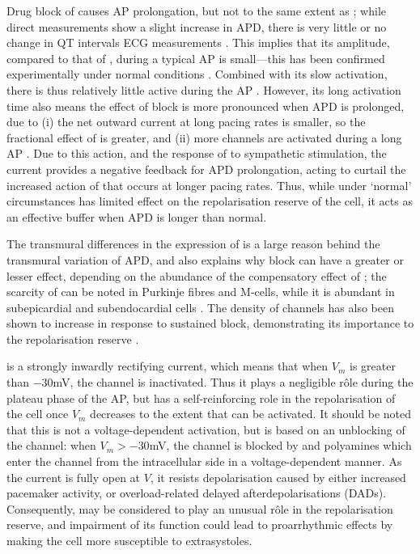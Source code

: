 \documentclass[../thesis-main.tex]{subfiles}
\begin{document}
Drug block of \iks{} causes AP prolongation, but not to the same extent as \ikr{}; while direct measurements show a slight increase in APD, there is very little or no change in QT intervals ECG measurements \citep{Varro2000, Lengyel2001, Jost2005}. This implies that its amplitude, compared to that of \ikr{}, during a typical AP is small---this has been confirmed experimentally under normal conditions \citep{Varro2011}. Combined with its slow activation, there is thus relatively little \iks{} active during the AP \citep{Jost2005}. However, its long activation time also means the effect of \iks{} block is more pronounced when APD is prolonged, due to (i) the net outward current at long pacing rates is smaller, so the fractional effect of \iks{} is greater, and (ii) more channels are activated during a long AP \citep{Carmeliet2006}. Due to this action, and the response of \iks{} to sympathetic stimulation, the current provides a negative feedback for APD prolongation, acting to curtail the increased action of \ica{} that occurs at longer pacing rates. Thus, while under `normal' circumstances \iks{} has limited effect on the repolarisation reserve of the cell, it acts as an effective buffer when APD is longer than normal.

The transmural differences in the expression of \iks{} is a large reason behind the transmural variation of APD, and also explains why \ikr{} block can have a greater or lesser effect, depending on the abundance of the compensatory effect of \iks; the scarcity of \iks{} can be noted in Purkinje fibres and M-cells, while it is abundant in subepicardial and subendocardial cells \citep{Vandenberg2001, Carmeliet2006}. The density of \iks{} channels has also been shown to increase in response to sustained \ikr{} block, demonstrating its importance to the repolarisation reserve \citep{Xiao2008}.

\ikix{} is a strongly inwardly rectifying \K{} current, which means that when $V_m$ is greater than $-30$mV, the channel is inactivated. Thus it plays a negligible r\^ole during the plateau phase of the AP, but has a self-reinforcing role in the repolarisation of the cell once $V_m$ decreases to the extent that \ikix{} can be activated. It should be noted that this is not a voltage-dependent activation, but is based on an unblocking of the channel: when $V_m > -30$mV, the channel is blocked by \mg{} and polyamines which enter the channel from the intracellular side in a voltage-dependent manner. As the current is fully open at $V$, it resists depolarisation caused by either increased pacemaker activity, or \ca{} overload-related delayed afterdepolarisations (DADs). Consequently, \ikix{} may be considered to play an unusual r\^ole in the repolarisation reserve, and impairment of its function could lead to proarrhythmic effects by making the cell more susceptible to extrasystoles.
\end{document}
